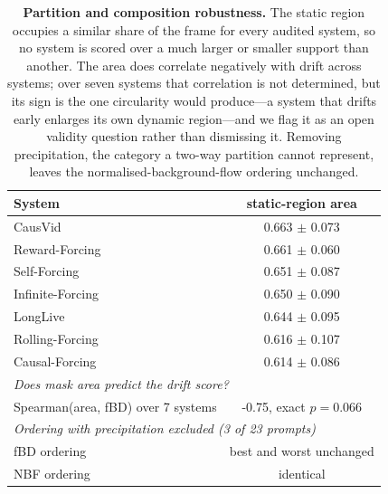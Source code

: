 \begin{table}[tb]
\centering
\small
\begin{tabular}{l c}
\toprule
System & static-region area \\
\midrule
CausVid & 0.663 $\pm$ 0.073 \\
Reward-Forcing & 0.661 $\pm$ 0.060 \\
Self-Forcing & 0.651 $\pm$ 0.087 \\
Infinite-Forcing & 0.650 $\pm$ 0.090 \\
LongLive & 0.644 $\pm$ 0.095 \\
Rolling-Forcing & 0.616 $\pm$ 0.107 \\
Causal-Forcing & 0.614 $\pm$ 0.086 \\
\midrule
\multicolumn{2}{l}{\emph{Does mask area predict the drift score?}} \\
Spearman(area, fBD) over 7 systems & -0.75, exact $p=0.066$ \\
\midrule
\multicolumn{2}{l}{\emph{Ordering with precipitation excluded (3 of 23 prompts)}} \\
fBD ordering & best and worst unchanged \\
NBF ordering & identical \\
\bottomrule
\end{tabular}
\caption{\textbf{Partition and composition robustness.} The static region occupies a similar share of the frame for every audited system, so no system is scored over a much larger or smaller support than another. The area does correlate negatively with drift across systems; over seven systems that correlation is not determined, but its sign is the one circularity would produce---a system that drifts early enlarges its own dynamic region---and we flag it as an open validity question rather than dismissing it. Removing precipitation, the category a two-way partition cannot represent, leaves the normalised-background-flow ordering unchanged.}
\label{tab:robustness}
\end{table}